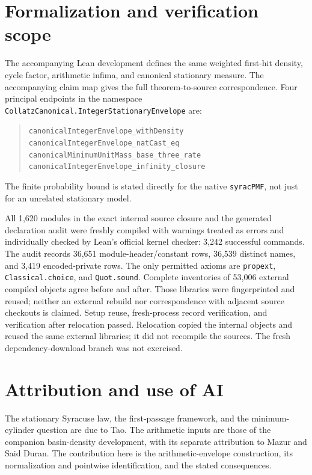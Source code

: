 \documentclass[11pt]{article}
\theoremstyle{remark}
\begin{document}
\section*{Formalization and verification scope}

The accompanying Lean development defines the same weighted first-hit
density, cycle factor, arithmetic infima, and canonical stationary
measure. The accompanying claim map gives the full theorem-to-source
correspondence. Four principal endpoints in the namespace
\nolinkurl{CollatzCanonical.IntegerStationaryEnvelope} are:
\begin{quote}\small\raggedright
\nolinkurl{canonicalIntegerEnvelope_withDensity}\\
\nolinkurl{canonicalIntegerEnvelope_natCast_eq}\\
\nolinkurl{canonicalMinimumUnitMass_base_three_rate}\\
\nolinkurl{canonicalIntegerEnvelope_infinity_closure}
\end{quote}
The finite probability bound is stated directly for the native
\nolinkurl{syracPMF}, not just for an unrelated stationary model.

All 1,620 modules in the exact internal source closure and the generated
declaration audit were freshly compiled with warnings treated as errors
and individually checked by Lean's official kernel checker: 3,242
successful commands. The audit records 36,651 module-header/constant
rows, 36,539 distinct names, and 3,419 encoded-private rows. The only
permitted axioms are \nolinkurl{propext}, \nolinkurl{Classical.choice},
and \nolinkurl{Quot.sound}. Complete inventories of 53,006 external
compiled objects agree before and after. Those libraries were
fingerprinted and reused; neither an external rebuild nor correspondence
with adjacent source checkouts is claimed. Setup reuse, fresh-process
record verification, and verification after relocation passed.
Relocation copied the internal objects and reused the same external
libraries; it did not recompile the sources. The fresh dependency-download
branch was not exercised.

\section*{Attribution and use of AI}
The stationary Syracuse law, the first-passage framework, and the
minimum-cylinder question are due to Tao. The arithmetic inputs are
those of the companion basin-density development, with its separate
attribution to Mazur and Said Duran. The contribution here is the
arithmetic-envelope construction, its normalization and pointwise
identification, and the stated consequences.
\end{document}
